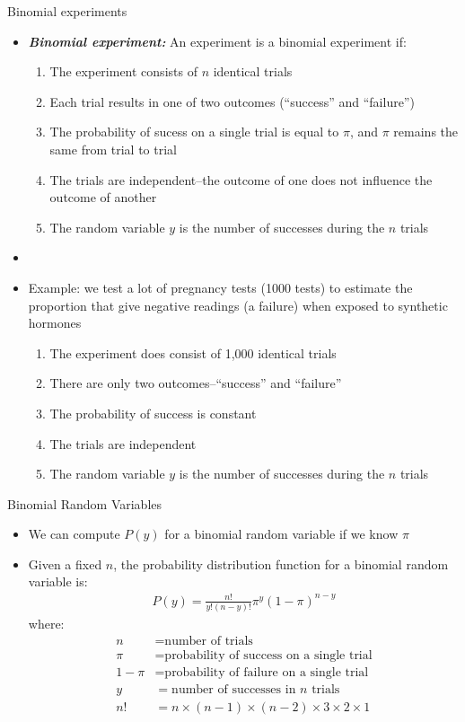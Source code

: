 \documentclass[xcolor=dvipsnames]{beamer}
\begin{document}
\begin{frame}{Binomial experiments}
	\begin{itemize}
		\item \textbf{\emph{Binomial experiment:}} An experiment is a binomial experiment if: \pause
		\begin{enumerate}
			\item The experiment consists of $n$ identical trials \pause
			\item Each trial results in one of two outcomes (``success'' and ``failure'') \pause
			\item The probability of sucess on a single trial is equal to $\pi$, and $\pi$ remains the same from trial to trial \pause
			\item The trials are independent--the outcome of one does not influence the outcome of another \pause
			\item The random variable $y$ is the number of successes during the $n$ trials
		\end{enumerate}
	\item[]
	\item Example: we test a lot of pregnancy tests (1000 tests) to estimate the proportion that give negative readings (a failure) when exposed to synthetic hormones \pause
	\begin{enumerate}
		\item The experiment does consist of 1,000 identical trials \pause
		\item There are only two outcomes--``success'' and ``failure'' \pause
		\item The probability of success is constant \pause
		\item The trials are independent \pause
		\item The random variable $y$ is the number of successes during the $n$ trials
	\end{enumerate}
	\end{itemize}
\end{frame}

\begin{frame}{Binomial Random Variables}
	\begin{itemize}
		\item We can compute $P(y)$ for a binomial random variable if we know $\pi$ \pause
		\item Given a fixed $n$, the probability distribution function for a binomial random variable is: 
		\begin{gather*}
		P(y) = \frac{n!}{y!(n-y)!} \pi^y (1-\pi)^{n-y}
		\end{gather*} \pause
		where:
		\begin{align*}
		n &= \text{number of trials} \\
		\pi &= \text{probability of success on a single trial} \\ 
		1- \pi &= \text{probability of failure on a single trial} \\
		y &= \text{number of successes in $n$ trials} \\
		n! &= n \times (n-1) \times (n-2) \times 3 \times 2 \times 1
		\end{align*}
	\end{itemize}
\end{frame}
\end{document}
